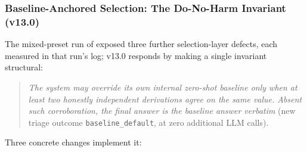 \documentclass[11pt,a4paper]{article}
\begin{document}
\subsubsection{Baseline-Anchored Selection: The Do-No-Harm Invariant (v13.0)}
\label{sec:do_no_harm}
The mixed-preset run of  exposed three further selection-layer defects, each measured in that run's log; v13.0 responds by making a single invariant structural:
\begin{quote}
\emph{The system may override its own internal zero-shot baseline only when at least two honestly independent derivations agree on the same value. Absent such corroboration, the final answer is the baseline answer verbatim} (new triage outcome \texttt{baseline\_default}, at zero additional LLM calls).
\end{quote}
Three concrete changes implement it:
\end{document}
